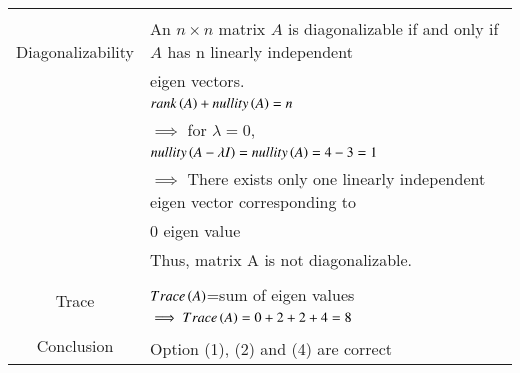 \documentclass[journal,12pt]{IEEEtran}
\begin{document}
\begin{longtable}{|c|l|}
	\hline
    \multirow{3}{*}{Diagonalizability} & \\
    & An $n\times n$ matrix $A$ is diagonalizable if and only if $A$ has n linearly independent \\& eigen vectors.\\
	& $rank\left(A\right)+nullity\left(A\right)=n$\\
	& $\implies$ for $\lambda=0$,\\
	& $nullity\left(A-\lambda I\right)=nullity\left(A\right)=4-3=1$\\
	& $\implies$ There exists only one linearly independent eigen vector corresponding to \\& $0$ eigen value\\
	& Thus, matrix A is not diagonalizable.\\
    \hline
    \multirow{3}{*}{Trace} & \\
	& $Trace\left(A\right)$=sum of eigen values\\
	& $\implies Trace\left(A\right)=0+2+2+4=8$\\
	\hline
	\multirow{3}{*}{Conclusion} & \\
	& Option (1), (2) and (4) are correct\\
	\hline
\end{longtable}
\end{document}
